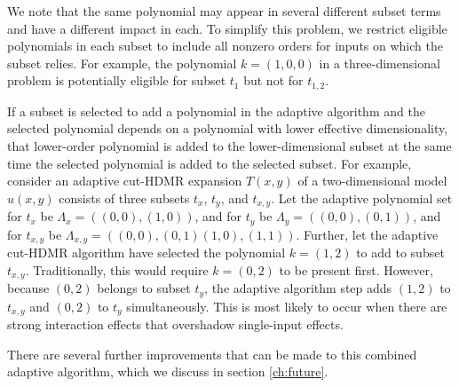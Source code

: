  \label{sec: one poly per subset}
We note that the same polynomial may appear in several different subset terms and have a
different impact in each.  To simplify this problem, we restrict eligible polynomials in each subset to
include all nonzero orders for inputs on which the subset relies.  For example, the polynomial $k=(1,0,0)$ in
a three-dimensional problem is potentially eligible for subset $t_1$ but not for $t_{1,2}$.

If a subset is
selected to add a polynomial in the adaptive algorithm and the selected polynomial depends on a polynomial with 
lower effective
dimensionality, that lower-order polynomial is added to the lower-dimensional subset at the same time the
selected polynomial is added to the selected subset.  For example, consider an adaptive cut-HDMR expansion $T(x,y)$ of a
two-dimensional model $u(x,y)$ consists of three subsets $t_x$, $t_y$, and $t_{x,y}$.  Let the adaptive
polynomial set for $t_x$ be $\Lambda_x = ( (0,0),(1,0) )$, and for $t_y$ be $\Lambda_y = ( (0,0),(0,1) )$, and for
$t_{x,y}$ be $\Lambda_{x,y} =( (0,0),(0,1)(1,0),(1,1))$.  Further, let the adaptive cut-HDMR algorithm have
selected the polynomial $k=(1,2)$ to add to subset $t_{x,y}$.  Traditionally, this would require $k=(0,2)$ to
be present first.  However, because $(0,2)$ belongs to subset $t_y$, the adaptive algorithm step adds $(1,2)$
to $t_{x,y}$ and $(0,2)$ to $t_y$ simultaneously.  This is most likely to occur when there are strong
interaction effects that overshadow single-input effects.

There are several further improvements that can be made to this combined adaptive algorithm, which we discuss
in section \ref{ch:future}.
